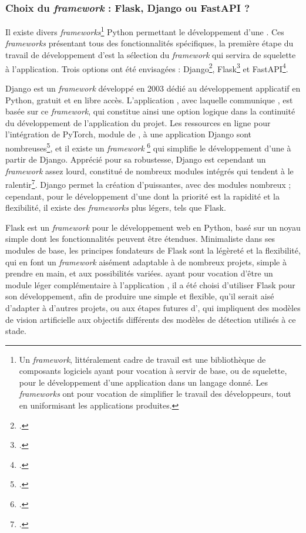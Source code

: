 	\subsubsection{Choix du \textit{framework} : Flask, Django ou FastAPI ?}
	Il existe divers \textit{frameworks}\footnote{Un \textit{framework}, littéralement \og cadre de travail \fg est une bibliothèque de composants logiciels ayant pour vocation à servir de base, ou de squelette, pour le développement d'une application dans un langage donné. Les \textit{frameworks} ont pour vocation de simplifier le travail des développeurs, tout en uniformisant les applications produites.} Python permettant le développement d'une \api. Ces \textit{frameworks} présentant tous des fonctionnalités spécifiques, la première étape du travail de développement d'\exapi est la sélection du \textit{framework} qui servira de squelette à l'application. Trois options ont été envisagées : Django\footcite{Django}, Flask\footcite{FlaskDocumentation} et FastAPI\footcite{FastAPI}.
	
	Django est un \textit{framework} développé en 2003 dédié au développement applicatif en Python, gratuit et en libre accès. L'application \eida, avec laquelle communique \exapi, est basée sur ce \textit{framework}, qui constitue ainsi une option logique dans la continuité du développement de l'application du projet. Les ressources en ligne pour l'intégration de PyTorch, module de \ml, à une application Django sont nombreuses\footcite{arslanCreateMachineLearning2021}, et il existe un \textit{framework} \rest\footcite{DjangoRESTFramework} qui simplifie le développement d'une \api à partir de Django. Apprécié pour sa robustesse, Django est cependant un \textit{framework} assez lourd, constitué de nombreux modules intégrés qui tendent à le ralentir\footcite{sandyChoosingDjangoFlask}. Django permet la création d'\api puissantes, avec des modules nombreux ; cependant, pour le développement d'une \api dont la priorité est la rapidité et la flexibilité, il existe des \textit{frameworks} plus légers, tels que Flask.
	
	Flask est un \textit{framework} pour le développement web en Python, basé sur un noyau simple dont les fonctionnalités peuvent être étendues. Minimaliste dans ses modules de base, les principes fondateurs de Flask sont la légèreté et la flexibilité, qui en font un \textit{framework} aisément adaptable à de nombreux projets, simple à prendre en main, et aux possibilités variées. \exapi ayant pour vocation d'être un module léger complémentaire à l'application \eida, il a été choisi d'utiliser Flask pour son développement, afin de produire une \api simple et flexible, qu'il serait aisé d'adapter à d'autres projets, ou aux étapes futures d'\eida, qui impliquent des modèles de vision artificielle aux objectifs différents des modèles de détection utilisés à ce stade.
	
